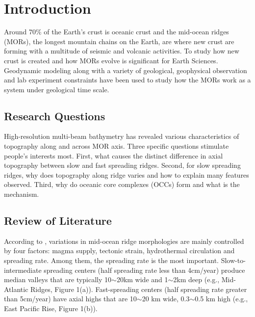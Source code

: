 \pagebreak
\section{Introduction}
\label{ch:Intro}  %

Around 70\% of the Earth's crust is oceanic crust and the mid-ocean ridges (MORs), the longest mountain chains on the Earth, are where new crust are forming with a multitude of seismic and volcanic activities. To study how new crust is created and how MORs evolve is significant for Earth Sciences.  Geodynamic modeling along with a variety of geological, geophysical observation and lab experiment constraints have been used to study how the MORs work as a system under geological time scale.

\subsection{Research Questions}
High-resolution multi-beam bathymetry has revealed various characteristics of topography along and across MOR axis. Three specific questions stimulate people's interests most. First, what causes the distinct difference in axial topography between slow and fast spreading ridges. Second, for slow spreading ridges, why does topography along ridge varies and how to explain many features observed. Third, why do oceanic core complexes (OCCs) form and what is the mechanism. 

\subsection{Review of Literature}
According to \citep{Fowler2004}, variations in  mid-ocean ridge morphologies are mainly controlled by four factors: magma supply, tectonic strain, hydrothermal circulation and spreading rate. Among them, the spreading rate is the most important. Slow-to-intermediate spreading centers (half spreading rate less than 4cm/year) produce median valleys that are typically 10$\sim$20km wide and 1$\sim$2km deep (e.g., Mid-Atlantic Ridges, Figure 1(a)). Fast-spreading centers (half spreading rate greater than 5cm/year) have axial highs that are 10$\sim$20 km wide, 0.3$\sim$0.5 km high (e.g., East Pacific Rise, Figure 1(b)).

